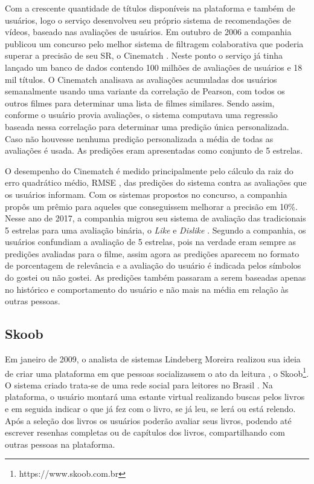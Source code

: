 Com a crescente quantidade de títulos disponíveis na plataforma e também de usuários, logo o serviço desenvolveu seu próprio sistema de recomendações de vídeos, baseado nas avaliações de usuários. Em outubro de 2006 a companhia publicou um concurso pelo melhor sistema de filtragem colaborativa que poderia superar a precisão de seu SR, o Cinematch \citep{bennett2007netflix}. Neste ponto o serviço já tinha lançado um banco de dados contendo 100 milhões de avaliações de usuários e 18 mil títulos. O Cinematch analisava as avaliações acumuladas dos usuários semanalmente usando uma variante da correlação de Pearson, com todos os outros filmes para determinar uma lista de filmes similares. Sendo assim, conforme o usuário provia avaliações, o sistema computava uma regressão baseada nessa correlação para determinar uma predição única personalizada. Caso não houvesse nenhuma predição personalizada a média de todas as avaliações é usada. As predições eram apresentadas como conjunto de 5 estrelas.

O desempenho do Cinematch é medido principalmente pelo cálculo da raiz do erro quadrático médio, \ac{RMSE} \citep{Herlocker:2004:ECF:963770.963772}, das predições do sistema contra as avaliações que os usuários informam. Com os sistemas propostos no concurso, a companhia propôs um prêmio para aqueles que conseguissem melhorar a precisão em 10\%. Nesse ano de 2017, a companhia migrou seu sistema de avaliação das tradicionais 5 estrelas para uma avaliação binária, o \textit{Like} e \textit{Dislike} \citep{ VarietyNetflix:2017}. Segundo a companhia, os usuários confundiam a avaliação de 5 estrelas, pois na verdade eram sempre as predições avaliadas para o filme, assim agora as predições aparecem no formato de porcentagem de relevância e a avaliação do usuário é indicada pelos símbolos do gostei ou não gostei. As predições também passaram a serem baseadas apenas no histórico e comportamento do usuário e não mais na média em relação às outras pessoas.

\subsection{Skoob}

Em janeiro de 2009, o analista de sistemas Lindeberg Moreira realizou sua ideia de criar uma plataforma em que pessoas socializassem o ato da leitura \citep{SkoobSocializando:2009}, o Skoob\footnote{ https://www.skoob.com.br}. O sistema criado trata-se de uma rede social para leitores no Brasil \citep{SkoobQuemSomos:2017}. Na plataforma, o usuário montará uma estante virtual realizando buscas pelos livros e em seguida indicar o que já fez com o livro, se já leu, se lerá ou está relendo. Após a seleção dos livros os usuários poderão avaliar seus livros, podendo até escrever resenhas completas ou de capítulos dos livros, compartilhando com outras pessoas na plataforma.


